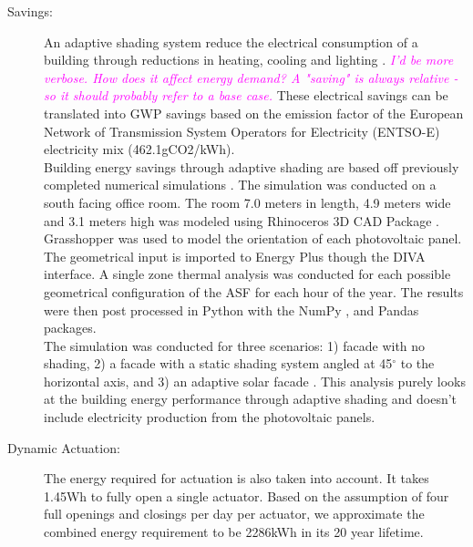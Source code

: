 \begin{description}


\item[Savings: ] An adaptive shading system reduce the electrical consumption of a building through reductions in heating, cooling and lighting \cite{jayathissa2015abs}. \textcolor{magenta}{\textit{I'd be more verbose. How does it affect energy demand? A "saving" is always relative - so it should probably refer to a base case.}}
These electrical savings can be translated into GWP savings based on the emission factor of the European Network of Transmission System Operators for Electricity (ENTSO-E) electricity mix (462.1gCO2/kWh)\cite{itten2012life}.\\

Building energy savings through adaptive shading are based off previously completed numerical simulations \cite{jayathissa2015abs}. The simulation was conducted on a south facing office room. The room 7.0 meters in length, 4.9 meters wide and 3.1 meters high was modeled using Rhinoceros 3D CAD Package \cite{Rhino}. Grasshopper \cite{grasshopper} was used to model the orientation of each photovoltaic panel. The geometrical input is imported to Energy Plus \cite{energyplus} though the DIVA \cite{DIVA} interface. A single zone thermal analysis was conducted for each possible geometrical configuration of the ASF for each hour of the year. The results were then post processed in Python \cite{python} with the NumPy \cite{numpy}, and Pandas \cite{pandas} packages.\\

The simulation was conducted for three scenarios: 1) facade with no shading, 2) a facade with a static shading system angled at 45$^{\circ}$ to the horizontal axis, and 3) an adaptive solar facade \cite{jayathissa2015abs}. This analysis purely looks at the building energy performance through adaptive shading and doesn't include electricity production from the photovoltaic panels.\\


\item[Dynamic Actuation: ] The energy required for actuation is also taken into account. It takes 1.45Wh to fully open a single actuator. Based on the assumption of four full openings and closings per day per actuator, we approximate the combined energy requirement to be 2286kWh in its 20 year lifetime. 


\end{description}
